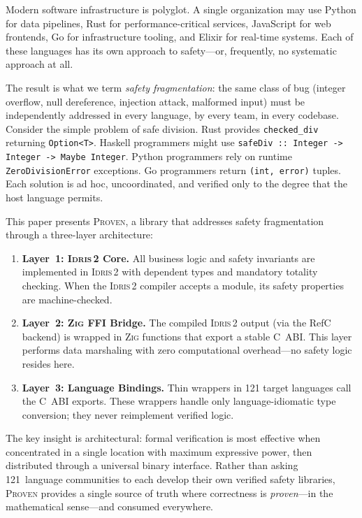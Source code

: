 \documentclass[11pt,a4paper]{article}
\newcommand{\proven}{\textsc{Proven}}
\newcommand{\idris}{\textsc{Idris\,2}}
\newcommand{\zig}{\textsc{Zig}}
\newcommand{\code}[1]{\texttt{#1}}
\begin{document}
Modern software infrastructure is polyglot. A single organization may use
Python for data pipelines, Rust for performance-critical services, JavaScript
for web frontends, Go for infrastructure tooling, and Elixir for
real-time systems. Each of these languages has its own approach to
safety---or, frequently, no systematic approach at all.

The result is what we term \emph{safety fragmentation}: the same class of
bug (integer overflow, null dereference, injection attack, malformed input)
must be independently addressed in every language, by every team, in every
codebase. Consider the simple problem of safe division. Rust provides
\code{checked\_div} returning \code{Option<T>}. Haskell programmers might
use \code{safeDiv :: Integer -> Integer -> Maybe Integer}. Python
programmers rely on runtime \code{ZeroDivisionError} exceptions. Go
programmers return \code{(int, error)} tuples. Each solution is
ad hoc, uncoordinated, and verified only to the degree that the host
language permits.

This paper presents \proven{}, a library that addresses safety
fragmentation through a three-layer architecture:

\begin{enumerate}[nosep]
  \item \textbf{Layer~1: \idris{} Core.} All business logic and safety
    invariants are implemented in \idris{} with dependent types and mandatory
    totality checking. When the \idris{} compiler accepts a module, its
    safety properties are machine-checked.
  \item \textbf{Layer~2: \zig{} FFI Bridge.} The compiled \idris{} output
    (via the RefC backend) is wrapped in \zig{} functions that export a
    stable C~ABI. This layer performs data marshaling with zero computational
    overhead---no safety logic resides here.
  \item \textbf{Layer~3: Language Bindings.} Thin wrappers in 121 target
    languages call the C~ABI exports. These wrappers handle only
    language-idiomatic type conversion; they never reimplement verified
    logic.
\end{enumerate}

The key insight is architectural: formal verification is most effective when
concentrated in a single location with maximum expressive power, then
distributed through a universal binary interface. Rather than asking
121~language communities to each develop their own verified safety
libraries, \proven{} provides a single source of truth where correctness is
\emph{proven}---in the mathematical sense---and consumed everywhere.
\end{document}
